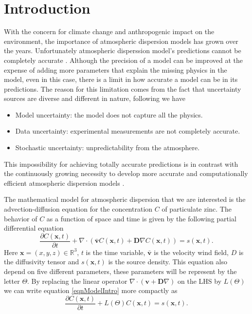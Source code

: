\documentclass[12pt]{book}
\newcommand{\x}{\textbf{x}}
\newcommand{\vv}{\textbf{v}}
\newcommand{\dv}{\nabla\cdot}
\begin{document}
\chapter{Introduction}

With the concern for climate change and anthropogenic impact on the environment, 
the importance of atmospheric dispersion models has grown over the years. Unfortunately
atmospheric disperssion model's predictions cannot be  completely accurate \cite{chatwin1982use,lewellen1989meteorological}. 
Although the precision of a model can be improved at the expense
of adding more parameters that explain the missing physics in the model, even
in this case, there is a limit in how accurate a model can be in its predictions.
The reason for this limitation comes from the fact that uncertainty sources
are diverse and different in nature, following  \cite{rao2005uncertainty}
we have 


\begin{itemize}
\item Model uncertainty: the model does not capture all the physics.
\item Data uncertainty: experimental measurements are not completely accurate.
\item Stochastic uncertainty: unpredictability from the atmosphere.
\end{itemize}

This impossibility for achieving totally accurate predictions
is in contrast with the continuously growing necessity to develop
more accurate and computationally efficient atmospheric dispersion models \cite{leelHossy2014dispersion}. 

The mathematical model for atmospheric dispersion that we are 
interested is the advection-diffusion equation
for the concentration $C$ of particulate zinc. The behavior of $C$
as a function of space and time is given by 
the following partial differential equation
\begin{equation}\label{eqnModelIntro}
\frac{\partial C(\x,t)}{\partial t}+\dv(\bar{\vv}C(\x,t)+\textbf{D}\nabla C(\x,t))=s(\x,t).
\end{equation}
Here $\x=(x,y,z)\in\mathbb{R}^{3}$, $t$ is the time variable, $\bar{\vv}$  is the velocity wind field, $D$
is the diffusivity tensor and $s(\x,t)$ is the source density. This equation also
depend on five different parameters, these parameters will be represent by the letter $\Theta$.
By replacing the linear operator $\dv(\vv+\textbf{D}\nabla)$ on the LHS by $L(\Theta)$ we can write equation \eqref{eqnModelIntro}
more compactly as
\begin{equation}\label{eqnParamtric}
\frac{\partial C(\x,t)}{\partial t}+L(\Theta)C(\x,t)=s(\x,t).
\end{equation}
\end{document}

